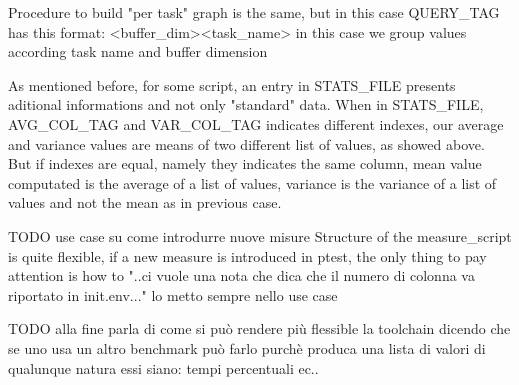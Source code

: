 \documentclass[a4paper,10pt]{article}
\begin{document}
\begin{multicols}{2}
Procedure to build "per task" graph is the same, but in this case QUERY\_TAG has this format: 
<buffer\_dim><task\_name> in this case we group values according task name and buffer dimension


As mentioned before, for some script, an entry in STATS\_FILE presents aditional informations 
and not only "standard" data. When in STATS\_FILE, AVG\_COL\_TAG and VAR\_COL\_TAG indicates different indexes, our average
and variance values are means of two different list of values, as showed above. But if indexes are equal, namely
they indicates the same column, mean value computated is the average of a list of values, variance
is the variance of a list of values and not the mean as in previous case.


TODO use case su come introdurre nuove misure
Structure of the measure_script is quite flexible, if a new measure is introduced in ptest, 
the only thing to pay attention is how to 
"..ci vuole una nota che dica che il numero di colonna va riportato in init.env..." lo metto sempre nello use case

TODO alla fine parla di come si può rendere più flessible la toolchain
dicendo che se uno usa un altro benchmark può farlo purchè produca una lista
di valori di qualunque natura essi siano: tempi percentuali ec..





\end{multicols}
\end{document}
